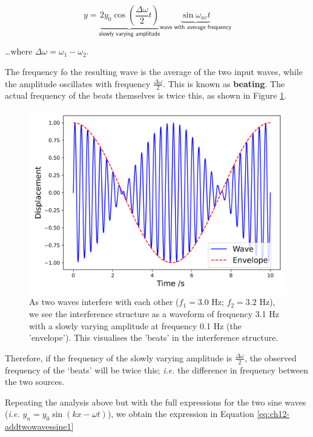 \documentclass[
]{book}
\begin{document}
\begin{equation}
y = \underbrace{ 2y_{0} \cos \left( \frac{\Delta \omega}{2}t \right)}_{\textsf{slowly varying amplitude}} \underbrace{ \sin \omega_{av}t}_{\textsf{wave with average frequency}}
\label{eq:ch12-addtwowavebeats5}
\end{equation}

\ldots where \(\Delta \omega = \omega_1 - \omega_2\).

The frequency fo the resulting wave is the average of the two input waves, while the amplitude oscillates with frequency \(\frac{\Delta \omega}{2}\). This is known as \textbf{beating}. The actual frequency of the beats themselves is twice this, as shown in Figure \ref{fig:ch12-oscillationbeats1}.

\begin{figure}

{\centering \includegraphics[width=0.7\linewidth]{visualisations/ch12-beats1} 

}

\caption{As two waves interfere with each other ($f_1 = 3.0$ Hz; $f_2 = 3.2$ Hz), we see the interference structure as a waveform of frequency 3.1 Hz with a slowly varying amplitude at frequency 0.1 Hz (the 'envelope'). This visualises the 'beats' in the interference structure.}\label{fig:ch12-oscillationbeats1}
\end{figure}

Therefore, if the frequency of the slowly varying amplitude is \(\frac{\Delta \omega}{2}\), the observed frequency of the `beats' will be twice this; \emph{i.e.} the difference in frequency between the two sources.

Repeating the analysis above but with the full expressions for the two sine waves (\emph{i.e.} \(y_n = y_0 \sin(kx - \omega t)\)), we obtain the expression in Equation \eqref{eq:ch12-addtwowavessine1}
\end{document}
